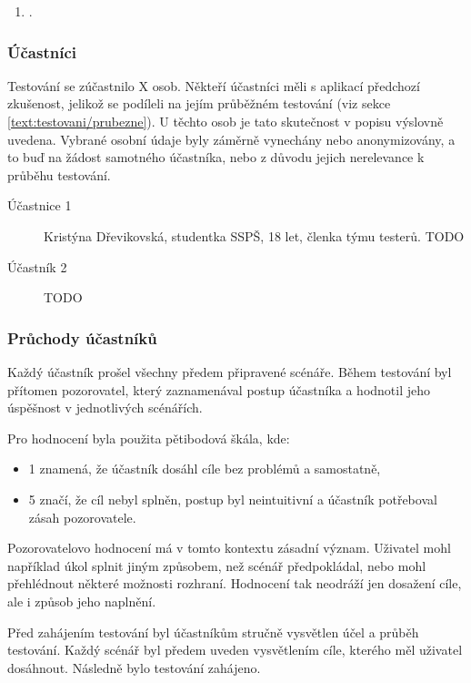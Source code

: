\begin{enumerate}[leftmargin=1.4cm]
    \item .
\end{enumerate}

\subsubsection{Účastníci}

Testování se zúčastnilo X osob. 
Někteří účastníci měli s aplikací předchozí zkušenost, jelikož se podíleli na jejím průběžném testování (viz sekce \ref{text:testovani/prubezne}). 
U těchto osob je tato skutečnost v popisu výslovně uvedena. 
Vybrané osobní údaje byly záměrně vynechány nebo anonymizovány, a to buď na žádost samotného účastníka, nebo z důvodu jejich nerelevance k průběhu testování.

\begin{description}
\item[Účastnice 1] Kristýna Dřevikovská, studentka SSPŠ, 18 let, členka týmu testerů.  TODO
\item[Účastník 2] TODO
\end{description}

\subsubsection{Průchody účastníků}

Každý účastník prošel všechny předem připravené scénáře.
Během testování byl přítomen pozorovatel, který zaznamenával postup účastníka a hodnotil jeho úspěšnost v jednotlivých scénářích. 

Pro hodnocení byla použita pětibodová škála, kde:

\begin{itemize}
      \item 1 znamená, že účastník dosáhl cíle bez problémů a samostatně,
      \item 5 značí, že cíl nebyl splněn, postup byl neintuitivní a účastník potřeboval zásah pozorovatele.
\end{itemize}

Pozorovatelovo hodnocení má v tomto kontextu zásadní význam. 
Uživatel mohl například úkol splnit jiným způsobem, než scénář předpokládal, nebo mohl přehlédnout některé možnosti rozhraní. 
Hodnocení tak neodráží jen dosažení cíle, ale i způsob jeho naplnění.

Před zahájením testování byl účastníkům stručně vysvětlen účel a průběh testování. 
Každý scénář byl předem uveden vysvětlením cíle, kterého měl uživatel dosáhnout. 
Následně bylo testování zahájeno.

